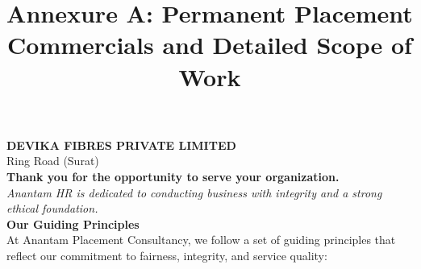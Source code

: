 \documentclass{article}
\title{\textbf{\color{primary} Annexure A: Permanent Placement Commercials and Detailed Scope of Work}}
\date{}
\begin{document}
\maketitle

\noindent\textbf{DEVIKA FIBRES PRIVATE LIMITED}\\
Ring Road (Surat)\\[1em]

\noindent\textbf{Thank you for the opportunity to serve your organization.}\\[0.5em]
\noindent\textit{Anantam HR is dedicated to conducting business with integrity and a strong ethical foundation.}\\[1em]

\noindent\textbf{\color{secondary} Our Guiding Principles}\\[0.5em]
\noindent At Anantam Placement Consultancy, we follow a set of guiding principles that reflect our commitment to fairness, integrity, and service quality:
\end{document}
